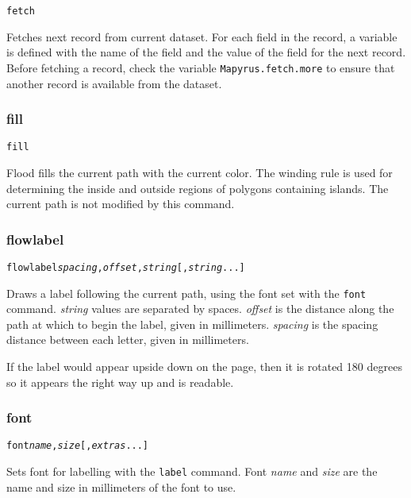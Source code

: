 \begin{alltt}
fetch
\end{alltt}

Fetches next record from current dataset.
For each field in the record, a variable is defined with the name
of the field and the value of the field for the next record.
Before fetching a record, check the variable
\texttt{Mapyrus.fetch.more}
to ensure that another record is available from the dataset.

\subsubsection{fill}

\begin{alltt}
fill
\end{alltt}

Flood fills the current path with the current color.
The winding rule is used for determining the inside and outside
regions of polygons containing islands.
The current path is not modified by this command.

\subsubsection{flowlabel}

\begin{alltt}
flowlabel \textit{spacing}, \textit{offset}, \textit{string} [, \textit{string} ...]
\end{alltt}

Draws a label following the current path,
using the font set with the \texttt{font} command.
\textit{string} values are
separated by spaces.
\textit{offset} is the distance along the path at which to begin
the label, given in millimeters.
\textit{spacing} is the spacing distance
between each letter, given in millimeters.

If the label would appear upside down on the page, then it is rotated
180 degrees so it appears the right way up and is readable.

\subsubsection{font}

\begin{alltt}
font \textit{name}, \textit{size} [, \textit{extras} ...]
\end{alltt}

Sets font for labelling with the \texttt{label} command.
Font \textit{name} and \textit{size} are the name and size in
millimeters of the font to use.

